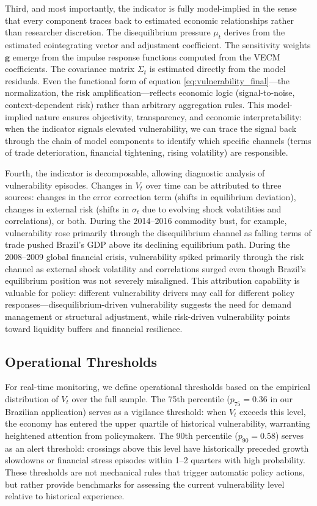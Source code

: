 \documentclass[12pt,a4paper]{article}
\numberwithin{equation}{section}
\theoremstyle{definition}
\theoremstyle{remark}
\newcommand{\vect}[1]{\boldsymbol{#1}}
\begin{document}
Third, and most importantly, the indicator is fully model-implied in the sense that every component traces back to estimated economic relationships rather than researcher discretion. The disequilibrium pressure $\mu_t$ derives from the estimated cointegrating vector and adjustment coefficient. The sensitivity weights $\vect{g}$ emerge from the impulse response functions computed from the VECM coefficients. The covariance matrix $\Sigma_t$ is estimated directly from the model residuals. Even the functional form of equation \eqref{eq:vulnerability_final}---the normalization, the risk amplification---reflects economic logic (signal-to-noise, context-dependent risk) rather than arbitrary aggregation rules. This model-implied nature ensures objectivity, transparency, and economic interpretability: when the indicator signals elevated vulnerability, we can trace the signal back through the chain of model components to identify which specific channels (terms of trade deterioration, financial tightening, rising volatility) are responsible.

Fourth, the indicator is decomposable, allowing diagnostic analysis of vulnerability episodes. Changes in $V_t$ over time can be attributed to three sources: changes in the error correction term (shifts in equilibrium deviation), changes in external risk (shifts in $\sigma_t$ due to evolving shock volatilities and correlations), or both. During the 2014--2016 commodity bust, for example, vulnerability rose primarily through the disequilibrium channel as falling terms of trade pushed Brazil's GDP above its declining equilibrium path. During the 2008--2009 global financial crisis, vulnerability spiked primarily through the risk channel as external shock volatility and correlations surged even though Brazil's equilibrium position was not severely misaligned. This attribution capability is valuable for policy: different vulnerability drivers may call for different policy responses---disequilibrium-driven vulnerability suggests the need for demand management or structural adjustment, while risk-driven vulnerability points toward liquidity buffers and financial resilience.


\subsection{Operational Thresholds}

For real-time monitoring, we define operational thresholds based on the empirical distribution of $V_t$ over the full sample. The 75th percentile ($p_{75} = 0.36$ in our Brazilian application) serves as a vigilance threshold: when $V_t$ exceeds this level, the economy has entered the upper quartile of historical vulnerability, warranting heightened attention from policymakers. The 90th percentile ($p_{90} = 0.58$) serves as an alert threshold: crossings above this level have historically preceded growth slowdowns or financial stress episodes within 1--2 quarters with high probability. These thresholds are not mechanical rules that trigger automatic policy actions, but rather provide benchmarks for assessing the current vulnerability level relative to historical experience.
\end{document}
